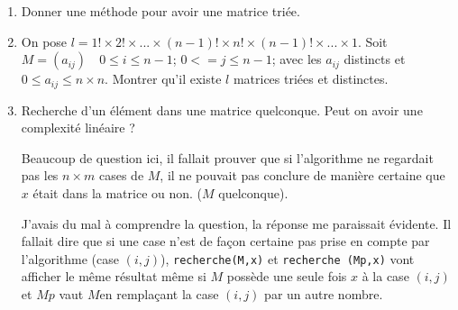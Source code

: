 \documentclass[10pt,fleqn]{article} %
\begin{document}
\begin{multicols}{2}
\begin{enumerate}


\item Donner une méthode pour avoir une matrice triée.




\item On pose $l= 1 ! \times  2 ! \times  ...\times  (n-1) ! \times  n ! \times (n-1) !\times  ...\times 1$. Soit $M = (a_{ij}) \quad  0 \leq i \leq n-1$;  $0<= j \leq n-1$; avec les $a_{ij}$ distincts et  $0 \leq a_{ij} \leq  n\times n$. Montrer qu'il existe $l$ matrices triées et distinctes.


\item Recherche d'un élément dans une matrice quelconque. Peut on avoir une complexité linéaire ?


\begin{rem}Beaucoup de question ici, il fallait prouver que si l'algorithme ne regardait pas les $n\times m$ cases de $M$, il ne pouvait pas conclure de manière certaine que $x$ était dans la matrice ou non. ($M$ quelconque). 

J'avais du mal à comprendre la question, la réponse me paraissait évidente. Il fallait dire que si une case n'est de façon certaine pas prise en compte par l'algorithme (case $(i,j)$), \texttt{recherche(M,x)} et \texttt{recherche (Mp,x)} vont afficher le même résultat même si $M$ possède une seule fois $x$ à la case $(i,j)$ et $Mp$ vaut $M $en remplaçant la case $(i,j)$ par un autre nombre.
\end{rem}


\end{enumerate}
\end{multicols}
\end{document}

